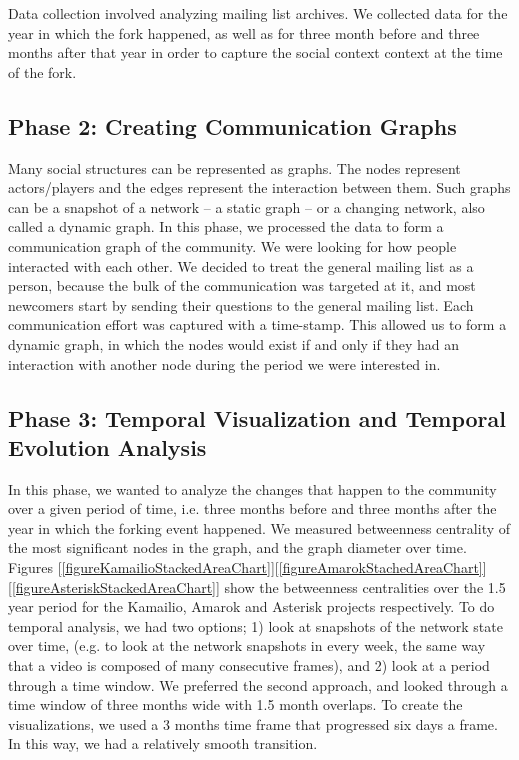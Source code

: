 \documentclass[conference]{IEEEtran}
\begin{document}
Data collection involved analyzing mailing list archives. We collected data for the year in which the fork happened, as well as for three month before and three months after that year in order to capture the social context context at the time of the fork.\\

\subsection{Phase 2: Creating Communication Graphs}

Many social structures can be represented as graphs. The nodes represent actors/players and the edges represent the interaction between them. Such graphs can be a snapshot of a network -- a static graph -- or a changing network, also called a dynamic graph. In this phase, we processed the data to form a communication graph of the community. We were looking for how people interacted with each other. We decided to treat the general mailing list as a person, because the bulk of the communication was targeted at it, and most newcomers start by sending their questions to the general mailing list. Each communication effort was captured with a time-stamp. This allowed us to form a dynamic graph, in which the nodes would exist if and only if they had an interaction with another node during the period we were interested in.\\

\subsection{Phase 3: Temporal Visualization and Temporal Evolution Analysis }

In this phase, we wanted to analyze the changes that happen to the community over a given period of time, i.e. three months before and three months after the year in which the forking event happened. We measured betweenness centrality \cite{Brandes} of the most significant nodes in the graph, and the graph diameter over time. Figures [\ref{figureKamailioStackedAreaChart}][\ref{figureAmarokStachedAreaChart}][\ref{figureAsteriskStackedAreaChart}] show the betweenness centralities over the 1.5 year period for the Kamailio, Amarok and Asterisk projects respectively. To do temporal analysis, we had two options; 1) look at snapshots of the network state over time, (e.g. to look at the network snapshots in every week, the same way that a video is composed of many consecutive frames), and 2) look at a period through a time window. We preferred the second approach, and looked through a time window of three months wide with 1.5 month overlaps. To create the visualizations, we used a 3 months time frame that progressed six days a frame. In this way, we had a relatively smooth transition.\\
\end{document}
